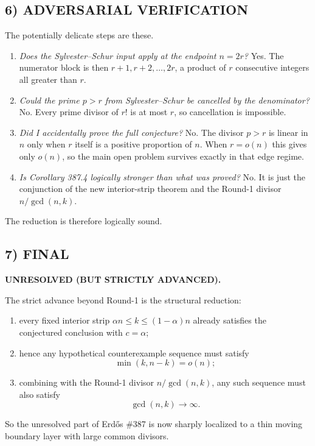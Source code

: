 \subsection*{6) ADVERSARIAL VERIFICATION}
The potentially delicate steps are these.

\begin{enumerate}
\item \emph{Does the Sylvester--Schur input apply at the endpoint $n=2r$?} Yes. The numerator block is then $r+1,r+2,\dots,2r$, a product of $r$ consecutive integers all greater than $r$.
\item \emph{Could the prime $p>r$ from Sylvester--Schur be cancelled by the denominator?} No. Every prime divisor of $r!$ is at most $r$, so cancellation is impossible.
\item \emph{Did I accidentally prove the full conjecture?} No. The divisor $p>r$ is linear in $n$ only when $r$ itself is a positive proportion of $n$. When $r=o(n)$ this gives only $o(n)$, so the main open problem survives exactly in that edge regime.
\item \emph{Is Corollary 387.4 logically stronger than what was proved?} No. It is just the conjunction of the new interior-strip theorem and the Round-1 divisor $n/\gcd(n,k)$.
\end{enumerate}

The reduction is therefore logically sound.

\subsection*{7) FINAL}
\textbf{UNRESOLVED (BUT STRICTLY ADVANCED).}

The strict advance beyond Round-1 is the structural reduction:

\begin{enumerate}
\item every fixed interior strip $\alpha n\leq k\leq (1-\alpha)n$ already satisfies the conjectured conclusion with $c=\alpha$;
\item hence any hypothetical counterexample sequence must satisfy
\[
\min(k,n-k)=o(n);
\]
\item combining with the Round-1 divisor $n/\gcd(n,k)$, any such sequence must also satisfy
\[
\gcd(n,k)\to\infty.
\]
\end{enumerate}

So the unresolved part of Erd\H{o}s \#387 is now sharply localized to a thin moving boundary layer with large common divisors.

